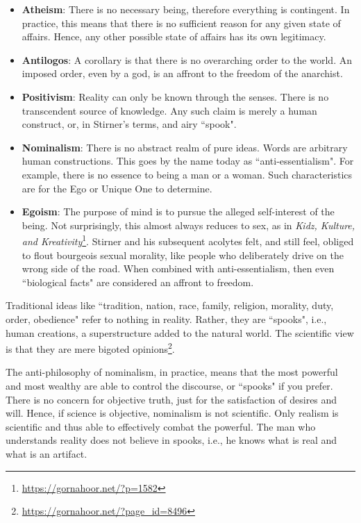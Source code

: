 \begin{itemize}
\item \textbf{Atheism}: There is no necessary being, therefore everything is contingent. In practice, this means that there is no sufficient reason for any given state of affairs. Hence, any other possible state of affairs has its own legitimacy. 
\item \textbf{Antilogos}: A corollary is that there is no overarching order to the world. An imposed order, even by a god, is an affront to the freedom of the anarchist. 
\item \textbf{Positivism}: Reality can only be known through the senses. There is no transcendent source of knowledge. Any such claim is merely a human construct, or, in Stirner's terms, and airy ``spook". 
\item \textbf{Nominalism}: There is no abstract realm of pure ideas. Words are arbitrary human constructions. This goes by the name today as ``anti-essentialism". For example, there is no essence to being a man or a woman. Such characteristics are for the Ego or Unique One to determine. 
\item \textbf{Egoism}: The purpose of mind is to pursue the alleged self-interest of the being. Not surprisingly, this almost always reduces to sex, as in \textit{Kidz, Kulture, and Kreativity}\footnote{\url{https://gornahoor.net/?p=1582}}. Stirner and his subsequent acolytes felt, and still feel, obliged to flout bourgeois sexual morality, like people who deliberately drive on the wrong side of the road. When combined with anti-essentialism, then even ``biological facts" are considered an affront to freedom. 
\end{itemize}
Traditional ideas like ``tradition, nation, race, family, religion, morality, duty, order, obedience" refer to nothing in reality. Rather, they are ``spooks", i.e., human creations, a superstructure added to the natural world. The scientific view is that they are mere bigoted opinions\footnote{\url{https://gornahoor.net/?page_id=8496}}.

The anti-philosophy of nominalism, in practice, means that the most powerful and most wealthy are able to control the discourse, or ``spooks" if you prefer. There is no concern for objective truth, just for the satisfaction of desires and will. Hence, if science is objective, nominalism is not scientific. Only realism is scientific and thus able to effectively combat the powerful. The man who understands reality does not believe in spooks, i.e., he knows what is real and what is an artifact.

